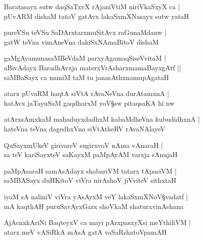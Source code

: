 \begin{shloka}
Baratasayx sutw daqSaTxvX rAjaniVtiM niriVkaSxyX ca |\\
pUvARM dishaM tatoV gatAvx lakaSxmXNasayx sutw yataH 
\end{shloka}

\begin{shloka}
pureVSu teVSu SaDArxtarxmuSitAvx raGunaMdanw |\\
gatW teVna vimAneVna dakiSxNAmaBitoV dishaM 
\end{shloka}

\begin{shloka}
gaMgAyamunasaMBeVdaM parxyAgamaqSiseVvitaM |\\
aBivAdayx BaradhAvxja materxVrAsharxmamaBayxgAtf ||\\
saMBaSayx ca muniM taM tu janasAthxnamupAgataH 
\end{shloka}

\begin{shloka}
atarx pUvaRM haqtA siVtA rAvaNeVna durAtamxnA |\\
hatAvx jaTayuSaM gaqdharxM yoV\S sw pitaqsaKA hi nw 
\end{shloka}

\begin{shloka}
atArxsAmxkaM mahaduyxdadhxM kabaMdheVna kubudidhxnA |\\
hateVna teVna dagedhxVna siVtAtheRV rAvaNAlayeV 
\end{shloka}

\begin{shloka}
QuSayxmUkeV girivareV sugirxvoV nAma vAnaraH |\\
sa teV kariSayxteV saKayxM paMpAyAM varxja sAnujaH
\end{shloka}

\begin{shloka}
paMpAsaraH samAsAdayx shabariVM tatarx tApasiVM |\\
saMBASayx duHKitoV viVra nirAshoV jiVviteV sithxtaH 
\end{shloka}

\begin{shloka}
iyaM sA naliniV viVra yAsAyxM veY lakaSxmXNoV\S vadatf |\\
mA kaqthAH puruSavAyxGarx shoVkaM shaturxvinAshana
\end{shloka}

\begin{shloka}
AjAcnxkAriNi BaqteyxV ca mayi pArxpasxyXsi meYthiliVM |\\
atarx meV vASiRkA mAsA gatA vaSaRshatoVpamAH
\end{shloka}

